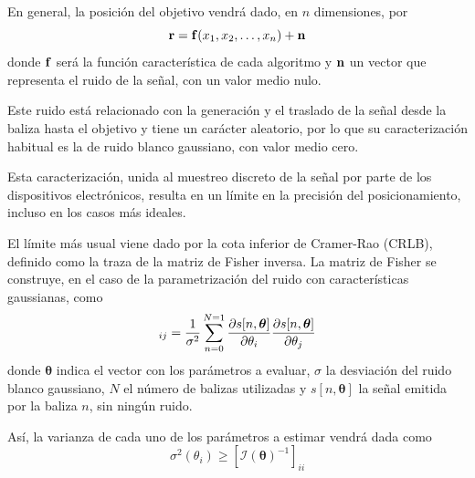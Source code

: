 En general, la posición del objetivo vendrá dado, en $n$ dimensiones, por
\begin{equation}\label{eq:geom}
    \vb{r} = \vb{f}(x_1, x_2, \ldots, x_n) + \vb{n}
\end{equation}
donde $\vb{f}$ será la función característica de cada algoritmo y $\vb{n}$ un vector que representa el ruido de la señal, con un valor medio nulo.



Este ruido está relacionado con la generación y el traslado de la señal desde la baliza hasta el objetivo y tiene un carácter aleatorio, por lo que su caracterización habitual es la de ruido blanco gaussiano, con valor medio cero.

Esta caracterización, unida al muestreo discreto de la señal por parte de los dispositivos electrónicos, resulta en un límite en la precisión del posicionamiento, incluso en los casos más ideales.

El límite más usual viene dado por la cota inferior de Cramer-Rao (CRLB), definido como la traza de la matriz de Fisher inversa.
La matriz de Fisher se construye, en el caso de la parametrización del ruido con características gaussianas, como \cite{Xbook}
\begin{equation}
    [\mathcal{I}(\bm{\theta})]_{ij} = \frac{1}{\sigma^2} \sum_{n=0}^{N=1} \pdv{s[n,\bm{\theta}]}{\theta_i}\pdv{s[n,\bm{\theta}]}{\theta_j}
\end{equation}
donde $\bm{\theta}$ indica el vector con los parámetros a evaluar, $\sigma$ la desviación del ruido blanco gaussiano, $N$ el número de balizas utilizadas y $s[n,\bm{\theta}]$ la señal emitida por la baliza $n$, sin ningún ruido.

Así, la varianza de cada uno de los parámetros a estimar vendrá dada como
\begin{equation}
    \sigma^2(\theta_i) \geq [\mathcal{I}(\bm{\theta})^{-1}]_{ii}
\end{equation}


